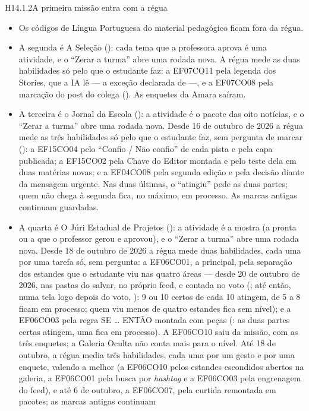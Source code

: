 \begin{historia}{H14.1.2}{A primeira missão entra com a régua}{\pronto}
\begin{itemize}
  \item Os códigos de Língua Portuguesa do material pedagógico ficam fora da
    régua.
  \item A segunda é A Seleção (): cada tema que a professora
    aprova é uma atividade, e o \enquote{Zerar a turma} abre uma rodada nova. A
    régua mede as duas habilidades só pelo que o estudante faz: a EF07CO11 pela
    legenda dos Stories, que a IA lê --- a exceção declarada de 
    ---, e a EF07CO08 pela marcação do post do colega (). As
    enquetes da Amara saíram.
  \item A terceira é o Jornal da Escola (): a atividade é o pacote
    das oito notícias, e o \enquote{Zerar a turma} abre uma rodada nova. Desde
    16 de outubro de 2026 a régua mede as três habilidades só pelo que o
    estudante faz, sem pergunta de marcar (): a EF15CO04 pelo
    \enquote{Confio / Não confio} de cada pista e pela capa publicada; a
    EF15CO02 pela Chave do Editor montada e pelo teste dela em duas matérias
    novas; e a EF04CO08 pela segunda edição e pela decisão diante da mensagem
    urgente. Nas duas últimas, o \enquote{atingiu} pede as duas partes; quem
    não chega à segunda fica, no máximo, em processo. As marcas antigas
    continuam guardadas.
  \item A quarta é O Júri Estadual de Projetos (): a atividade é a
    mostra (a pronta ou a que o professor gerou e aprovou), e o \enquote{Zerar a turma} abre
    uma rodada nova. Desde 18 de outubro de 2026 a régua mede duas
    habilidades, cada uma por uma tarefa só, sem pergunta: a EF06CO01, a
    principal, pela separação dos estandes que o estudante viu nas quatro
    áreas --- desde 20 de outubro de 2026, nas pastas do salvar, no próprio
    feed, e contada no voto (; até então, numa tela logo depois
    do voto, ): 9 ou 10 certos de cada 10
    atingem, de 5 a 8 ficam em processo; quem viu menos de quatro estandes fica
    sem nível); e a EF06CO03 pela regra SE \ldots{} ENTÃO montada com peças
    (: as duas partes certas atingem, uma fica em processo). A
    EF06CO10 saiu da missão, com as três enquetes; a Galeria Oculta não conta
    mais para o nível. Até 18 de outubro, a régua media três habilidades, cada
    uma por um gesto e por uma enquete, valendo a melhor (a EF06CO10 pelos
    estandes escondidos abertos na galeria, a EF06CO01 pela busca por
    \emph{hashtag} e a EF06CO03 pela engrenagem do feed), e até 6 de outubro,
    a EF06CO07, pela curtida remontada em pacotes; as marcas antigas continuam

\end{itemize}
\end{historia}

